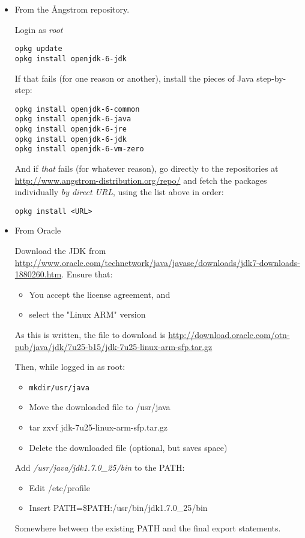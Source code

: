 \begin{itemize}
\item From the Ångstrom repository.

Login as \emph{root}
\begin{verbatim}
opkg update
opkg install openjdk-6-jdk
\end{verbatim}
If that fails (for one reason or another), install the pieces of Java step-by-step:
\begin{verbatim}
opkg install openjdk-6-common
opkg install openjdk-6-java
opkg install openjdk-6-jre
opkg install openjdk-6-jdk
opkg install openjdk-6-vm-zero 
\end{verbatim}
And if \emph{that} fails (for whatever reason), go directly to the repositories at \url{http://www.angstrom-distribution.org/repo/} and fetch the packages individually \emph{by direct URL}, using the list above in order:
\begin{verbatim}
opkg install <URL>
\end{verbatim}
\item From Oracle

Download the JDK from \url{http://www.oracle.com/technetwork/java/javase/downloads/jdk7-downloads-1880260.htm}.
Ensure that:
\begin{itemize}
\item You accept the license agreement, and
\item select the "Linux ARM" version 
\end{itemize}

As this is written, the file to download is
\url{http://download.oracle.com/otn-pub/java/jdk/7u25-b15/jdk-7u25-linux-arm-sfp.tar.gz}


Then, while logged in as root:
\begin{itemize}
\item \begin{alltt}
mkdir /usr/java
\end{alltt}
\item Move the downloaded file to /usr/java
\item tar zxvf jdk-7u25-linux-arm-sfp.tar.gz
\item Delete the downloaded file (optional, but saves space)
\end{itemize}
Add \emph{/usr/java/jdk1.7.0\_25/bin} to the PATH:
\begin{itemize}
\item Edit /etc/profile
\item Insert PATH=\$PATH:/usr/bin/jdk1.7.0\_25/bin  
\end{itemize}
Somewhere between the existing PATH and the final export statements.
\end{itemize}



